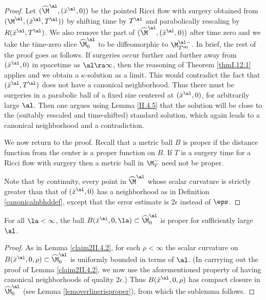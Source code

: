 \begin{proof}
Let $(\widehat\M^\al,(\bar x^\al,0))$ be the pointed Ricci flow
with surgery obtained from $(\M^\al,(\bar x^\al,T^\al))$
by shifting time by $T^\al$ and parabolically rescaling by
$R(\bar x^\al,T^\al)$.
We also remove the part of
$(\widehat\M^\al,(\bar x^\al,0))$ after time zero and
we take the time-zero slice $\widehat\M^\al_0$ to be
diffeomorphic to $\M^{\al -}_{T^\al}$.
In brief, the rest of the proof goes as follows.  If surgeries
occur further and further away from $(\bar x^\al,0)$
in spacetime as $\al\ra\infty$, then the reasoning of Theorem
\ref{thmI.12.1} applies and we obtain a $\kappa$-solution as a limit.
This would contradict the fact that $(\bar x^\al,T^\al)$ does
not have a canonical neighborhood.  Thus there must be
surgeries in a parabolic ball of a fixed size centered
at $(\bar x^\al,0)$, for arbitrarily large $\al$. Then one
argues using
Lemma \ref{II.4.5} that the solution will be close to
the (suitably rescaled and time-shifted) standard solution,
which again leads to a canonical neighborhood and a
contradiction.

We now return to the proof.
Recall that a metric ball $B$ is
proper if the distance function from the center is a proper
function on $B$. If $T$ is a surgery time for a
Ricci flow with surgery then
a metric ball in $\M_T^-$ need not be proper.

Note that by continuity,
every  point in $\widehat\M^\al$ whose scalar
curvature is strictly greater than that of $(\bar x^\al,0)$ has a
neighborhood as in Definition \ref{canonicalnbhddef}, except
that the error estimate
is $2 \epsilon$ instead of $\eps$.

\end{proof}
\begin{lemma}
  \label{lem:kl-construction-ricci-flow-surgery-ricci-flow-surgery-lemma}

For all $\la<\infty$,
the ball $B(\bar x^\al,0,\la)\subset\widehat\M^\al_0$
is proper for sufficiently
large $\al$.
\end{lemma}
\begin{proof}
As in Lemma \ref{claim2II.4.2}, for each $\rho < \infty$
the scalar curvature on
$B(\bar x^\al, 0, \rho) \subset \widehat\M^{\al}_0$
is uniformly bounded in terms of $\al$.
(In carrrying out the proof of Lemma \ref{claim2II.4.2},
we now use the aforementioned property of having
canonical neighborhoods of quality $2\epsilon$.)
Thus $B(\bar x^\al, 0, \rho)$ has compact closure in
$\widehat\M^{\al}_0$
(see Lemma \ref{lemoverlinerisproper}), from which the sublemma follows.
\end{proof}
